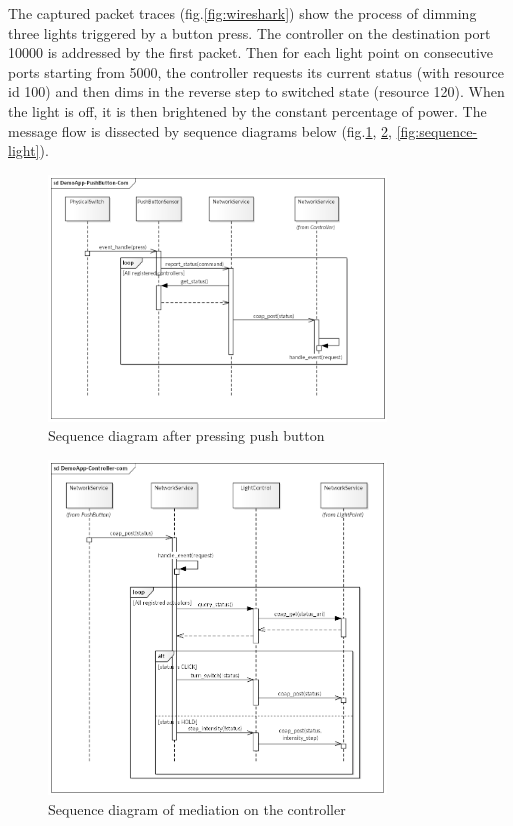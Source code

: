 \documentclass[11pt, english, a4paper, twoside]{article}
\begin{document}
The captured packet traces (fig.\ref{fig:wireshark}) show the process of dimming three lights triggered by a button press. The controller on the destination port 10000 is addressed by the first packet. Then for each light point on consecutive ports starting from 5000, the controller requests its current status (with resource id 100) and then dims in the reverse step to switched state (resource 120). When the light is off, it is then brightened by the constant percentage of power. The message flow is dissected by sequence diagrams below (fig.\ref{fig:sequence-button}, \ref{fig:sequence-controller}, \ref{fig:sequence-light}).

\begin{figure}[h!]
	\centering
	\includegraphics[width=0.8\textwidth]{DemoApp-PushButton-Com.png}
	\caption{Sequence diagram after pressing push button}
	\label{fig:sequence-button}
\end{figure}
\begin{figure}[h!]
	\centering
	\includegraphics[width=0.8\textwidth]{DemoApp-Controller-Com.png}
	\caption{Sequence diagram of  mediation on the controller}
	\label{fig:sequence-controller}
\end{figure}
\end{document}
